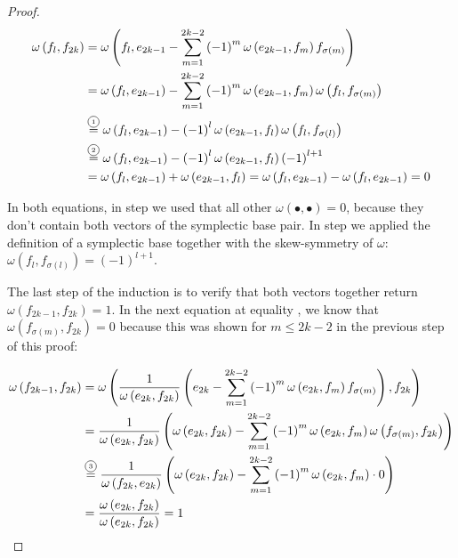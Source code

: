 \documentclass[../SymplecticSimplices.tex]{subfiles}
\begin{document}
\begin{proof}
  \begin{equation*}
    \begin{split}
      \omega \left( f_l, f_{2k} \right) & = \omega \left( f_l,  e_{2k-1} - \sum \limits _{m=1}^{2k-2} \left( -1 \right)^{m} \omega \left( e_{2k-1}, f_m \right) f_{\sigma \left( m \right)} \right) \\ &
      = \omega \left( f_l, e_{2k-1} \right) - \sum \limits _{m=1}^{2k-2} \left( -1 \right)^{m} \omega \left( e_{2k-1}, f_m \right) \omega \left( f_l, f_{\sigma \left( m \right)} \right) \\ &
    \eqcom{1} \omega \left( f_l, e_{2k-1} \right) - \left( -1 \right)^{l} \omega \left( e_{2k-1}, f_l \right) \omega \left( f_l, f_{\sigma \left( l \right)} \right) \\ &
    \eqcom{2} \omega \left( f_l, e_{2k-1} \right) - \left( -1 \right)^{l} \omega \left( e_{2k-1}, f_l \right) \left( -1 \right)^{l+1} \\ &
    = \omega \left( f_l, e_{2k-1} \right) + \omega \left( e_{2k-1}, f_l \right) = \omega \left( f_l, e_{2k-1} \right) - \omega \left( f_l, e_{2k-1} \right) = 0
    \end{split}
  \end{equation*}

  In both equations, in step  we used that all other \( \omega \left( \bullet, \bullet \right) = 0 \), because they don't contain both vectors of the symplectic base pair. In step  we applied the definition of a symplectic base together with the skew-symmetry of \( \omega \): \( \omega \left( f_l, f_{\sigma \left( l \right)} \right) = \left( -1 \right)^{l+1} \).

  The last step of the induction is to verify that both vectors together return \( \omega \left( f_{2k-1}, f_{2k} \right) = 1 \). In the next equation at equality , we know that \( \omega \left( f_{\sigma \left( m \right)}, f_{2k} \right) = 0 \) because this was shown for \( m \leq 2k-2 \) in the previous step of this proof:

  \begin{equation*}
    \begin{split}
      \omega \left( f_{2k-1}, f_{2k} \right) & = \omega \left( \frac{1}{\omega \left( e_{2k}, f_{2k} \right)} \left( e_{2k} - \sum \limits _{m=1}^{2k-2} \left( -1 \right)^{m} \omega \left( e_{2k}, f_m \right) f_{\sigma \left( m \right)}  \right), f_{2k} \right) \\ &
      = \frac{1}{\omega \left( e_{2k}, f_{2k} \right)} \left( \omega \left( e_{2k}, f_{2k} \right) - \sum \limits _{m=1}^{2k-2} \left( -1 \right)^{m} \omega \left( e_{2k}, f_m \right) \omega \left( f_{\sigma \left( m \right)}, f_{2k} \right) \right) \\ &
      \eqcom{3} \frac{1}{\omega \left( f_{2k}, e_{2k} \right)} \left( \omega \left( e_{2k}, f_{2k} \right) - \sum \limits _{m=1}^{2k-2} \left( -1 \right)^{m} \omega \left( e_{2k}, f_m \right) \cdot 0 \right) \\ &
      = \frac{\omega \left( e_{2k}, f_{2k} \right)}{\omega \left( e_{2k}, f_{2k} \right)} = 1
    \end{split}
  \end{equation*}


\end{proof}
\end{document}
